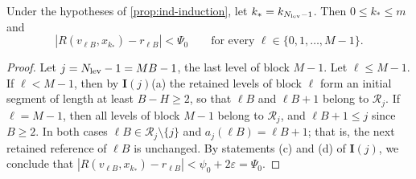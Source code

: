 \begin{corollary}\label{cor:ind-witness}
Under the hypotheses of \cref{prop:ind-induction}, let $k_*=k_{N_{\rm lev}-1}$. Then $0\le k_*\le m$ and
\[
 |R(v_{{\ell}B},x_{k_*})-r_{{\ell}B}|<\Psi_0\qquad\text{for every }{\ell}\in\{0,1,\dots,M-1\}.
\]
\end{corollary}

\begin{proof}
Let $j=N_{\rm lev}-1=MB-1$, the last level of block $M-1$. Let ${\ell}\le M-1$. If ${\ell}<M-1$, then by $\mathbf I(j)$(a) the retained levels of block ${\ell}$ form an initial segment of length at least $B-H\ge2$, so that ${\ell}B$ and ${\ell}B+1$ belong to $\mathcal R_j$. If ${\ell}=M-1$, then all levels of block $M-1$ belong to $\mathcal R_j$, and ${\ell}B+1\le j$ since $B\ge2$. In both cases ${\ell}B\in\mathcal R_j\setminus\{j\}$ and $a_j({\ell}B)={\ell}B+1$; that is, the next retained reference of ${\ell}B$ is unchanged. By statements (c) and (d) of $\mathbf I(j)$, we conclude that $|R(v_{{\ell}B},x_{k_*})-r_{{\ell}B}|<\psi_0+2\varepsilon=\Psi_0$.
\end{proof}
